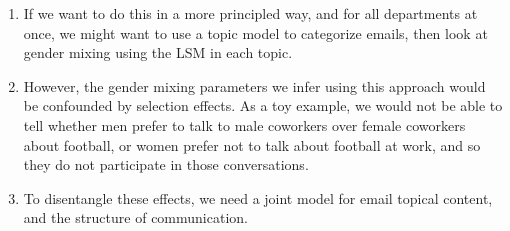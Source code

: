 \documentclass[fleqn]{MJDArticle}
\begin{document}
\begin{enumerate}
	
	
	
%
	
	\item If we want to do this in a more principled way, and for all departments at once, we might want to use a topic model to categorize emails, then look at gender mixing using the LSM in each topic.
	
	\item However, the gender mixing parameters we infer using this approach would be confounded by selection effects. As a toy example, we would not be able to tell whether men prefer to talk to male coworkers over female coworkers about football, or women prefer not to talk about football at work, and so they do not participate in those conversations. 
	\item To disentangle these effects, we need a joint model for email topical content, and the structure of communication.
\end{enumerate}
\end{document}

